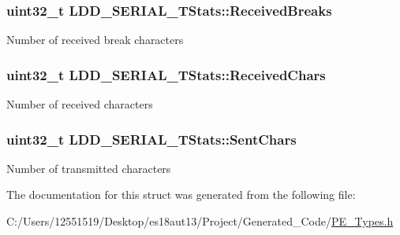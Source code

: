 \subsubsection[{Received\+Breaks}]{\setlength{\rightskip}{0pt plus 5cm}uint32\+\_\+t L\+D\+D\+\_\+\+S\+E\+R\+I\+A\+L\+\_\+\+T\+Stats\+::\+Received\+Breaks}\label{struct_l_d_d___s_e_r_i_a_l___t_stats_a45f707461666b974a6c3b5c948e66cf7}
Number of received break characters \hypertarget{struct_l_d_d___s_e_r_i_a_l___t_stats_a7dd5faa8bc6c15fde011eb6192ca6168}{}
\subsubsection[{Received\+Chars}]{\setlength{\rightskip}{0pt plus 5cm}uint32\+\_\+t L\+D\+D\+\_\+\+S\+E\+R\+I\+A\+L\+\_\+\+T\+Stats\+::\+Received\+Chars}\label{struct_l_d_d___s_e_r_i_a_l___t_stats_a7dd5faa8bc6c15fde011eb6192ca6168}
Number of received characters \hypertarget{struct_l_d_d___s_e_r_i_a_l___t_stats_a60198f844b85f9e73efaca83e32471cd}{}
\subsubsection[{Sent\+Chars}]{\setlength{\rightskip}{0pt plus 5cm}uint32\+\_\+t L\+D\+D\+\_\+\+S\+E\+R\+I\+A\+L\+\_\+\+T\+Stats\+::\+Sent\+Chars}\label{struct_l_d_d___s_e_r_i_a_l___t_stats_a60198f844b85f9e73efaca83e32471cd}
Number of transmitted characters 

The documentation for this struct was generated from the following file\+:\begin{DoxyCompactItemize}
\item 
C\+:/\+Users/12551519/\+Desktop/es18aut13/\+Project/\+Generated\+\_\+\+Code/\hyperlink{_p_e___types_8h}{P\+E\+\_\+\+Types.\+h}\end{DoxyCompactItemize}
